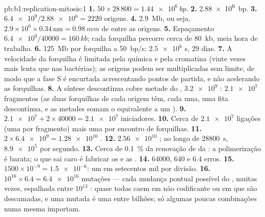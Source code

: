\begin{solution}{pb:b1:replication-mitosis:1}
\textbf{1.} $50\times 28\,800 = \qty{1.44e6}{bp}$.
\textbf{2.} \qty{2.88e6}{bp}.
\textbf{3.} $\num{6.4e9}/\num{2.88e6} = 2220$ origens.
\textbf{4.} \qty{2.9}{Mb}, ou seja, $2.9\times 10^6\times 0.34\,\mathrm{nm} =
\qty{0.98}{mm}$ de  entre as origens.
\textbf{5.} Espaçamento $\num{6.4e9}/\num{40000} = \qty{160}{kb}$; cada
forquilha percorre cerca de \qty{80}{kb}, meia hora de trabalho.
\textbf{6.} \qty{125}{Mb} por forquilha a \qty{50}{bp/s}:
$\num{2.5e6}$ s, 29 dias.
\textbf{7.} A velocidade da forquilha é limitada pela química e pela
cromatina (vinte vezes mais lenta que nas bactérias); as origens podem
ser multiplicadas sem limite, de modo que a fase S é encurtada
acrescentando pontos de partida, e não acelerando as forquilhas.
\textbf{8.} A síntese descontínua cobre metade do ,
$\num{3.2e9}$ : $\num{2.1e7}$ fragmentos (as duas
forquilhas de cada origem têm, cada uma, uma fita descontínua, e as
metades somam o equivalente a um ).
\textbf{9.} $\num{2.1e7} + 2\times\num{40000} = \num{2.1e7}$
iniciadores.
\textbf{10.} Cerca de $\num{2.1e7}$ ligações (uma por fragmento) mais
uma por encontro de forquilhas.
\textbf{11.} $2\times\num{6.4e9} = \num{1.28e10}$ .
\textbf{12.} $\num{2.56e10}$ ; ao longo de \qty{28800}{s},
$\num{8.9e5}$ por segundo.
\textbf{13.} Cerca de \qty{0.1}{\%} da renovação de  da : a
polimerização é barata; o que sai caro é fabricar os  e as
.
\textbf{14.} \num{64000}, 640 e 6.4 erros.
\textbf{15.} $1500\times 10^{-9} = \num{1.5e-6}$: um  em setecentos
mil por divisão.
\textbf{16.} $10^{16}\times 6.4 = \num{6.4e16}$ mutações --- cada
mudança pontual possível do , muitas vezes, espalhada entre
$10^{13}$ : quase todas caem em  não codificante ou em 
que são descamadas, e uma  mutada é uma entre bilhões; só algumas
poucas combinações numa mesma  importam.

\end{solution}

